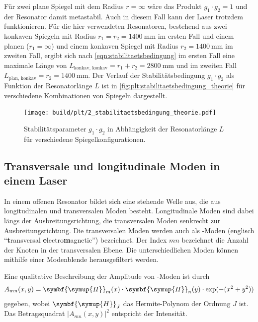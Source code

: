     Für zwei plane Spiegel mit dem Radius $r = \infty$ wäre das Produkt $g_1 \cdot g_2 = 1$ und der Resonator damit metastabil.
    Auch in diesem Fall kann der Laser trotzdem funktionieren.
    Für die hier verwendeten Resonatoren,
    bestehend aus zwei konkaven Spiegeln mit Radius $r_1 = r_2 = \SI{1400}{\milli\meter}$ im ersten Fall
    und einem planen ($r_1 = \infty$) und einem konkaven Spiegel mit Radius $r_2 = \SI{1400}{\milli\meter}$ im zweiten Fall,
    ergibt sich nach \autoref{eqn:stabilitaetsbedingung} im ersten Fall eine maximale Länge von $L_\text{konkav, konkav} = r_1 + r_2 = \SI{2800}{\milli\meter}$
    und im zweiten Fall $L_\text{plan, konkav} = r_2 = \SI{1400}{\milli\meter}$.
    Der Verlauf der Stabilitätsbedingung $g_1 \cdot g_2$ als Funktion der Resonatorlänge $L$ ist in \autoref{fig:plt:stabilitaetsbedingung_theorie}
    für verschiedene Kombinationen von Spiegeln dargestellt.

    \begin{figure}[H]
        \centering
        \texttt{[image: build/plt/2\_stabilitaetsbedingung\_theorie.pdf]}
        \caption{Stabilitätsparameter $g_1 \cdot g_2$ in Abhängigkeit der Resonatorlänge $L$ für verschiedene Spiegelkonfigurationen.}
        \label{fig:plt:stabilitaetsbedingung_theorie}
    \end{figure}



\subsection{Transversale und longitudinale Moden in einem Laser}
\label{sec:moden}

    In einem offenen Resonator bildet sich eine stehende Welle aus,
    die aus longitudinalen und transversalen Moden besteht.
    Longitudinale Moden sind dabei längs der Ausbreitungsrichtung,
    die transversalen Moden senkrecht zur Ausbreitungsrichtung.
    Die transversalen Moden werden auch als -Moden (englisch \enquote{\textbf{t}ransversal \textbf{e}lectro\textbf{m}agnetic}) bezeichnet.
    Der Index $mn$ bezeichnet die Anzahl der Knoten in der transversalen Ebene.
    Die unterschiedlichen Moden können mithilfe einer Modenblende herausgefiltert werden.

    Eine qualitative Beschreibung der Amplitude von -Moden ist durch
    \def\H{\symbf{\symup{H}}}
    \begin{equation}
        A_{mn}(x, y) =
        \H_m(x) \cdot \H_n(y) \cdot \exp(-(x^2 + y^2))
        \label{eqn:tem}
    \end{equation}
    gegeben,
    wobei $\H_J$ das Hermite-Polynom der Ordnung $J$ ist.
    Das Betragsquadrat $|A_{mn}(x, y)|^2$ entspricht der Intensität.



